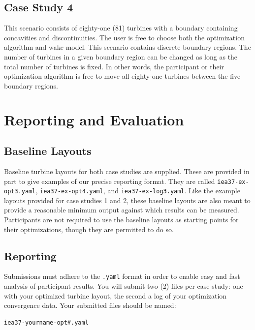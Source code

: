\documentclass[10pt]{article}
\begin{document}
    \subsection{Case Study 4}

        This scenario consists of eighty-one (81) turbines with a boundary containing concavities and discontinuities.
        The user is free to choose both the optimization algorithm and wake model.  This scenario contains discrete boundary regions.  The number of turbines in a given boundary region can be changed as long as the total number of turbines is fixed.  In other words, the participant or their optimization algorithm is free to move all eighty-one turbines between the five boundary regions.

\section{Reporting and Evaluation}

    \subsection{Baseline Layouts}
    \label{sec:BaselineLayouts}
        Baseline turbine layouts for both case studies are supplied.
        These are provided in part to give examples of our precise reporting format.
        They are called \texttt{iea37-ex-opt3.yaml}, \texttt{iea37-ex-opt4.yaml}, and \texttt{iea37-ex-log3.yaml}.
        Like the example layouts provided for case studies 1 and 2, these baseline layouts are also meant to provide a reasonable minimum output against which results can be measured.
        Participants are not required to use the baseline layouts as starting points for their optimizations, though they are permitted to do so.

    \subsection{Reporting}
    \label{sec:Reporting}
        Submissions must adhere to the \texttt{.yaml} format in order to enable easy and fast analysis of participant results.
        You will submit two (2) files per case study: one with your optimized turbine layout, the second a log of your optimization convergence data.
        Your submitted files should be named:
        
        \vspace{0.5em}
        \texttt{iea37-yourname-opt\#.yaml}
        
\end{document}
